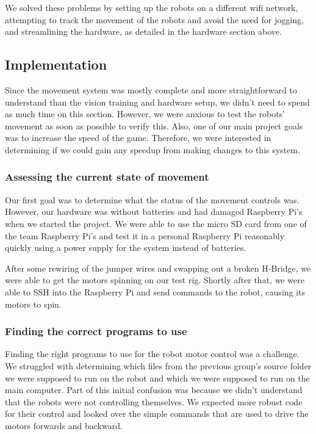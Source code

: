 \documentclass[a4paper,12pt]{article}
\begin{document}
We solved these problems by setting up the robots on a different wifi network, attempting to track the movement of the robots and avoid the need for jogging, and streamlining the hardware, as detailed in the hardware section above.

	
\subsection{Implementation}
	Since the movement system was mostly complete and more straightforward to understand than the vision training and hardware setup, we didn’t need to spend as much time on this section. However, we were anxious to test the robots’ movement as soon as possible to verify this. Also, one of our main project goals was to increase the speed of the game. Therefore, we were interested in determining if we could gain any speedup from making changes to this system.

	\subsubsection{Assessing the current state of movement}
	Our first goal was to determine what the status of the movement controls was. However, our hardware was without batteries and had damaged Raspberry Pi’s when we started the project. We were able to use the micro SD card from one of the team Raspberry Pi’s and test it in a personal Raspberry Pi reasonably quickly using a power supply for the system instead of batteries. 

	After some rewiring of the jumper wires and swapping out a broken H-Bridge, we were able to get the motors spinning on our test rig. Shortly after that, we were able to SSH into the Raspberry Pi and send commands to the robot, causing its motors to spin.


	\subsubsection{Finding the correct programs to use}
	Finding the right programs to use for the robot motor control was a challenge. We struggled with determining which files from the previous group’s source folder we were supposed to run on the robot and which we were supposed to run on the main computer. Part of this initial confusion was because we didn’t understand that the robots were not controlling themselves. We expected more robust code for their control and looked over the simple commands that are used to drive the motors forwards and backward.
\end{document}
